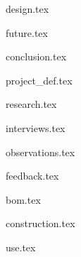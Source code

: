 \documentclass{book}
\begin{document}
{design.tex}

{future.tex}

{conclusion.tex}

\appendix

{project_def.tex}

{research.tex}

{interviews.tex}

{observations.tex}

{feedback.tex}

{bom.tex}

{construction.tex}

{use.tex}

\backmatter

\printbibliography[
title={References},
heading=bibintoc
]
\end{document}
